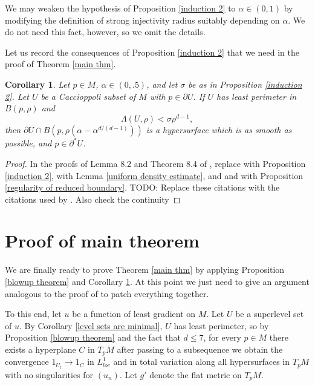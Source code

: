 \documentclass[reqno,12pt,letterpaper]{amsart}
\newtheorem{corollary}[theorem]{Corollary}
\theoremstyle{definition}
\numberwithin{equation}{section}
\begin{document}
We may weaken the hypothesis of Proposition \ref{induction 2} to $\alpha \in (0, 1)$ by modifying the definition of strong injectivity radius suitably depending on $\alpha$.
We do not need this fact, however, so we omit the details.

Let us record the consequences of Proposition \ref{induction 2} that we need in the proof of Theorem \ref{main thm}.

\begin{corollary}\label{tangent cones 1}
Let $p \in M$, $\alpha \in (0, .5)$, and let $\sigma$ be as in Proposition \ref{induction 2}.
Let $U$ be a Caccioppoli subset of $M$ with $p \in \partial U$.
If $U$ has least perimeter in $B(p, \rho)$ and
$$\Lambda(U, \rho) < \sigma \rho^{d - 1},$$
then $\partial U \cap B(p, \rho(\alpha - \alpha^{d/(d-1)}))$ is a hypersurface which is as smooth as possible, and $p \in \partial^* U$.
\end{corollary}
\begin{proof}
In the proofs of Lemma 8.2 and Theorem 8.4 of \cite{Giusti77}, replace \cite[Theorem 8.1]{Giusti77} with Proposition \ref{induction 2}, \cite[(5.16)]{Giusti77} with Lemma \ref{uniform density estimate},
and \cite[Theorem 4.11]{Giusti77} and \cite{morrey2009multiple} with Proposition \ref{regularity of reduced boundary}.
TODO: Replace these citations with the citations used by \cite[Teorema 4]{Miranda67}.
Also check the continuity
\end{proof}

\section{Proof of main theorem}\label{proof of main thm}
We are finally ready to prove Theorem \ref{main thm} by applying Proposition \ref{blowup theorem} and Corollary \ref{tangent cones 1}.
At this point we just need to give an argument analogous to the proof of \cite[Teorema 4]{Miranda67} to patch everything together.

To this end, let $u$ be a function of least gradient on $M$.
Let $U$ be a superlevel set of $u$.
By Corollary \ref{level sets are minimal}, $U$ has least perimeter, so by Proposition \ref{blowup theorem} and the fact that $d \leq 7$, for every $p \in M$ there exists a hyperplane $C$ in $T_pM$ after passing to a subsequence we obtain the convergence $1_{U_t} \to 1_C$ in $L^1_{loc}$
and in total variation along all hypersurfaces in $T_pM$ with no singularities for $(u_n)$.
Let $g'$ denote the flat metric on $T_pM$.
\end{document}

